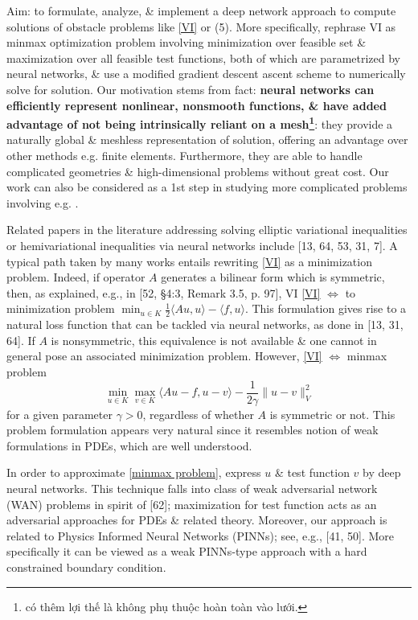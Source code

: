 \documentclass{article}
\begin{document}
\begin{enumerate}
\begin{itemize}
		Aim: to formulate, analyze, \& implement a deep network approach to compute solutions of obstacle problems like \eqref{VI} or (5). More specifically, rephrase VI as minmax optimization problem involving minimization over feasible set \& maximization over all feasible test functions, both of which are parametrized by neural networks, \& use a modified gradient descent ascent scheme to numerically solve for solution. Our motivation stems from fact: {\bf neural networks can efficiently represent nonlinear, nonsmooth functions, \& have added advantage of not being intrinsically reliant on a mesh\footnote{có thêm lợi thế là không phụ thuộc hoàn toàn vào lưới.}}: they provide a naturally global \& meshless representation of solution, offering an advantage over other methods e.g. finite elements. Furthermore, they are able to handle complicated geometries \& high-dimensional problems without great cost. Our work can also be considered as a 1st step in studying more complicated problems involving e.g. .
		
		Related papers in the literature addressing solving elliptic variational inequalities or hemivariational inequalities via neural networks include [13, 64, 53, 31, 7]. A typical path taken by many works entails rewriting \eqref{VI} as a minimization problem. Indeed, if operator $A$ generates a bilinear form which is symmetric, then, as explained, e.g., in [52, §4:3, Remark 3.5, p. 97], VI \eqref{VI} $\Leftrightarrow$ to minimization problem $\min_{u\in K} \frac{1}{2}\langle Au,u\rangle - \langle f,u\rangle$. This formulation gives rise to a natural loss function that can be tackled via neural networks, as done in [13, 31, 64]. If $A$ is nonsymmetric, this equivalence is not available \& one cannot in general pose an associated minimization problem. However, \eqref{VI} $\Leftrightarrow$ minmax problem
		\begin{equation}
			\label{minmax problem}
			\min_{u\in K}\max_{v\in K} \langle Au - f,u - v\rangle - \frac{1}{2\gamma}\|u - v\|_V^2
		\end{equation}
		for a given parameter $\gamma > 0$, regardless of whether $A$ is symmetric or not. This problem formulation appears very natural since it resembles notion of weak formulations in PDEs, which are well understood.
		
		In order to approximate \eqref{minmax problem}, express $u$ \& test function $v$ by deep neural networks. This technique falls into class of weak adversarial network (WAN) problems in spirit of [62]; maximization for test function acts as an adversarial approaches for PDEs \& related theory. Moreover, our approach is related to Physics Informed Neural Networks (PINNs); see, e.g., [41, 50]. More specifically it can be viewed as a weak PINNs-type approach with a hard constrained boundary condition.
		

\end{itemize}
\end{enumerate}
\end{document}
